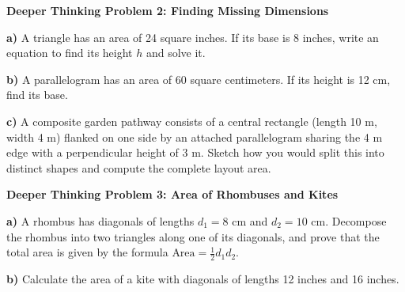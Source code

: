 \documentclass[12pt, letterpaper, fleqn]{article}
\begin{document}
\begin{tcolorbox}[colback=white, colframe=black, boxrule=1pt, arc=4mm, left=6mm, right=6mm, top=5mm, bottom=5mm]
\textbf{Deeper Thinking Problem 2: Finding Missing Dimensions}

\medskip

\noindent
\textbf{a)} A triangle has an area of 24 square inches. If its base is 8 inches, write an equation to find its height $h$ and solve it.

\vspace{4cm}

\noindent
\textbf{b)} A parallelogram has an area of 60 square centimeters. If its height is 12 cm, find its base.

\vspace{5cm}

\noindent
\textbf{c)} A composite garden pathway consists of a central rectangle (length 10 m, width 4 m) flanked on one side by an attached parallelogram sharing the 4 m edge with a perpendicular height of 3 m. Sketch how you would split this into distinct shapes and compute the complete layout area.

\vspace{6cm}

\end{tcolorbox}
\newpage

\begin{tcolorbox}[colback=white, colframe=black, boxrule=1pt, arc=4mm, left=6mm, right=6mm, top=5mm, bottom=5mm]
\textbf{Deeper Thinking Problem 3: Area of Rhombuses and Kites}

\medskip

\noindent
\textbf{a)} A rhombus has diagonals of lengths $d_1 = 8$ cm and $d_2 = 10$ cm. Decompose the rhombus into two triangles along one of its diagonals, and prove that the total area is given by the formula $\text{Area} = \frac{1}{2}d_1 d_2$.

\vspace{4cm}

\noindent
\textbf{b)} Calculate the area of a kite with diagonals of lengths 12 inches and 16 inches.

\vspace{3cm}
\end{tcolorbox}
\end{document}

